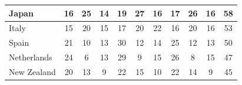 \documentclass[12pt]{article}  %
\begin{document}
\begin{longtable}{l|c|c|c|c|c|c|c|c|c|c}
	\hline
	Japan                & 16                                                                     & 25                                                                     & 14                                                                     & 19                                                                     & 27                                                                     & 16                                                                     & 17                        & 26                          & 16                          & 58                         \\ 
	\hline
	Italy                & 15                                                                     & 20                                                                     & 15                                                                     & 17                                                                     & 20                                                                     & 22                                                                     & 16                        & 20                          & 16                          & 53                         \\ 
	\hline
	Spain                & 21                                                                     & 10                                                                     & 13                                                                     & 30                                                                     & 12                                                                     & 14                                                                     & 25                        & 12                          & 13                          & 50                         \\ 
	\hline
	Netherlands          & 24                                                                     & 6                                                                      & 13                                                                     & 29                                                                     & 9                                                                      & 15                                                                     & 26                        & 8                           & 15                          & 47                         \\ 
	\hline
	New Zealand          & 20                                                                     & 13                                                                     & 9                                                                      & 22                                                                     & 15                                                                     & 10                                                                     & 22                        & 14                          & 9                           & 45                         \\ 

\end{longtable}
\end{document}
